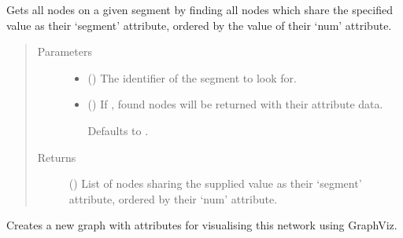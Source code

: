 \documentclass[letterpaper,10pt,english]{sphinxmanual}
\begin{document}
\begin{fulllineitems}
\begin{fulllineitems}
\label{\detokenize{cockatoo:cockatoo.KnitNetworkBase.nodes_on_segment}}
Gets all nodes on a given segment by finding all nodes which share the
specified value as their ‘segment’ attribute, ordered by the value of
their ‘num’ attribute.
\begin{quote}\begin{description}
\item[{Parameters}] \leavevmode\begin{itemize}
\item {} 
 () \textendash{} The identifier of the segment to look for.

\item {} 
 (\sphinxstyleliteralemphasis{\sphinxupquote{, }}) \textendash{} 
If , found nodes will be returned with their attribute data.

Defaults to .


\end{itemize}

\item[{Returns}] \leavevmode
{} () \textendash{} List of nodes sharing the supplied value as their ‘segment’
attribute, ordered by their ‘num’ attribute.

\end{description}\end{quote}

\end{fulllineitems}


\begin{fulllineitems}
\label{\detokenize{cockatoo:cockatoo.KnitNetworkBase.prepare_for_graphviz}}
Creates a new graph with attributes for visualising this network
using GraphViz.


\end{fulllineitems}
\end{fulllineitems}
\end{document}
